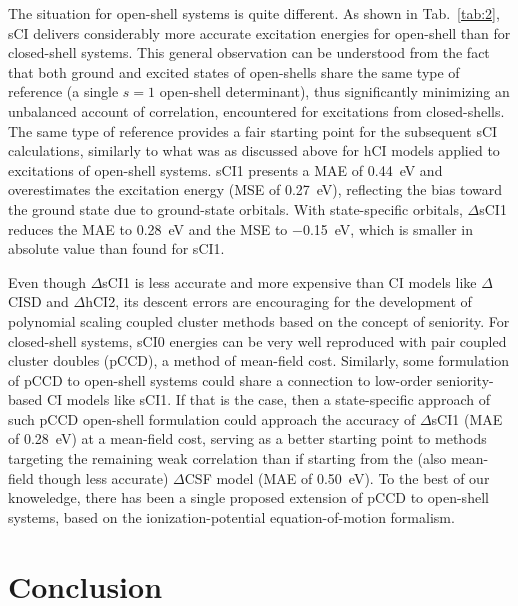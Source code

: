 \documentclass[aip,jcp,reprint,noshowkeys,superscriptaddress]{revtex4-1}
\begin{document}
The situation for open-shell systems is quite different.
As shown in Tab.~\ref{tab:2}, sCI delivers considerably more accurate excitation energies for open-shell than for closed-shell systems.
This general observation can be understood from the fact that both ground and excited states of open-shells share the same type of reference (a single $s=1$ open-shell determinant),
thus significantly minimizing an unbalanced account of correlation, encountered for excitations from closed-shells.
The same type of reference provides a fair starting point for the subsequent sCI calculations, similarly to what was as discussed above for hCI models applied to excitations of open-shell systems.
sCI1 presents a MAE of \SI{0.44}{\eV} and overestimates the excitation energy (MSE of \SI{+0.27}{\eV}), reflecting the bias toward the ground state due to ground-state orbitals.
With state-specific orbitals, $\Delta$sCI1 reduces the MAE to \SI{0.28}{\eV} and the MSE to \SI{-0.15}{\eV}, which is smaller in absolute value than found for sCI1.

Even though $\Delta$sCI1 is less accurate and more expensive than CI models like $\Delta$CISD and $\Delta$hCI2, 
its descent errors are encouraging for the development of polynomial scaling coupled cluster methods based on the concept of seniority.
For closed-shell systems, sCI0 energies can be very well reproduced with pair coupled cluster doubles (pCCD), \cite{Kossoski_2021} a method of mean-field cost.
Similarly, some formulation of pCCD to open-shell systems could share a connection to low-order seniority-based CI models like sCI1.
If that is the case, then a state-specific approach of such pCCD open-shell formulation could approach the accuracy of $\Delta$sCI1 (MAE of \SI{0.28}{\eV}) at a mean-field cost,
serving as a better starting point to methods targeting the remaining weak correlation than if starting from the (also mean-field though less accurate) $\Delta$CSF model (MAE of \SI{0.50}{\eV}).
To the best of our knoweledge, there has been a single proposed extension of pCCD to open-shell systems,
based on the ionization-potential equation-of-motion formalism. \cite{Boguslawski_2021}



\section{Conclusion}
\label{sec:ccl}

\end{document}
